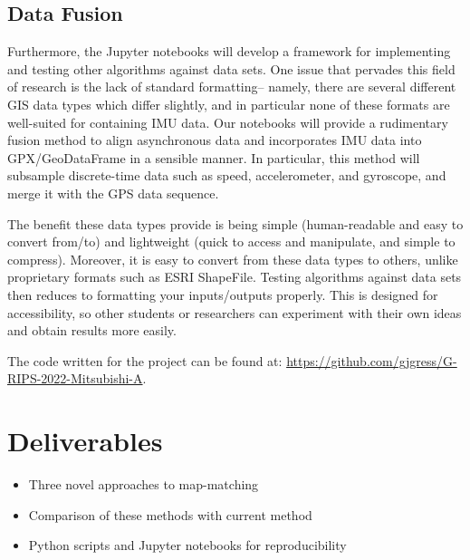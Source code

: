\documentclass{article}
\numberwithin{equation}{section}
\theoremstyle{definition}
\begin{document}

\subsection{Data Fusion}
Furthermore, the Jupyter notebooks will develop a framework for implementing and testing other algorithms against data sets. One issue that pervades this field of research is the lack of standard formatting-- namely, there are several different GIS data types which differ slightly, and in particular none of these formats are well-suited for containing IMU data. Our notebooks will provide a rudimentary fusion method to align asynchronous data and incorporates IMU data into GPX/GeoDataFrame in a sensible manner. In particular, this method will subsample discrete-time data such as speed, accelerometer, and gyroscope, and merge it with the GPS data sequence.

The benefit these data types provide is being simple (human-readable and easy to convert from/to) and lightweight (quick to access and manipulate, and simple to compress). Moreover, it is easy to convert from these data types to others, unlike proprietary formats such as ESRI ShapeFile. Testing algorithms against data sets then reduces to formatting your inputs/outputs properly. This is designed for accessibility, so other students or researchers can experiment with their own ideas and obtain results more easily. %

The code written for the project can be found at:  \url{https://github.com/gjgress/G-RIPS-2022-Mitsubishi-A}.

\section{Deliverables}
\begin{itemize}
    \item Three novel approaches to map-matching 
    \item Comparison of these methods with current method
    \item Python scripts and Jupyter notebooks for reproducibility
\end{itemize}
 
\end{document}
